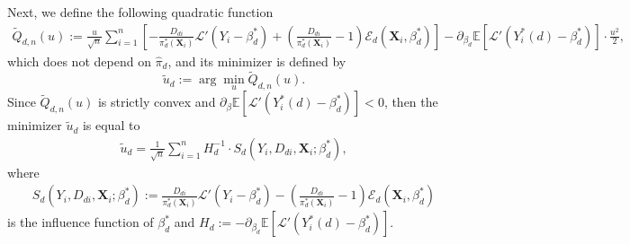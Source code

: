 \documentclass[11pt]{article}
\numberwithin{equation}{section}
\begin{document}
Next, we define the following quadratic function
\begin{align*}
	\widetilde{Q}_{d,n}(u):=\frac{u}{\sqrt{n}}\sum_{i=1}^n\left[-\frac{D_{di}}{{\pi}^*_d(\boldsymbol{X}_{i})}\mathcal{L}'(Y_i-\beta_d^*)+\left(\frac{D_{di}}{\pi_d^*(\boldsymbol{X}_{i})}-1\right)\mathcal{E}_{d}(\boldsymbol{X}_{i},\beta_d^*) \right]-\partial_{\beta_d}\mathbb{E}[\mathcal{L}'(Y^*_i(d)-\beta_d^*)]\cdot \frac{u^2}{2},
\end{align*}
which does not depend on $\widehat{\pi}_d$, and its minimizer is defined by
$$\widetilde{u}_{d}:=\arg\min_{u} \widetilde{Q}_{d,n}(u).$$
Since $\widetilde{Q}_{d,n}(u)$ is strictly convex and $\partial_{\beta}\mathbb{E}[\mathcal{L}'(Y^*_i(d)-\beta_d^*)]<0$, then the minimizer $\widetilde{u}_d$ is equal to
\begin{align*}
	\widetilde{u}_{d}=\frac{1}{\sqrt{n}}\sum_{i=1}^nH_d^{-1}\cdot S_d(Y_i,D_{di},\boldsymbol{X}_{i};\beta_d^*),
\end{align*}
where
\begin{align*}
	S_d(Y_i,D_{di},\boldsymbol{X}_{i};\beta_d^*):= \frac{D_{di}}{{\pi}^*_d(\boldsymbol{X}_{i})}\mathcal{L}'(Y_i-\beta_d^*)-\left(\frac{D_{di}}{\pi_d^*(\boldsymbol{X}_{i})}-1\right)\mathcal{E}_{d}(\boldsymbol{X}_{i},\beta_d^*)
\end{align*}
is the influence function of $\beta_d^*$ and $H_d:=-\partial_{\beta_d}\mathbb{E}[\mathcal{L}'(Y^*_i(d)-\beta_d^*)]$.
\end{document}
